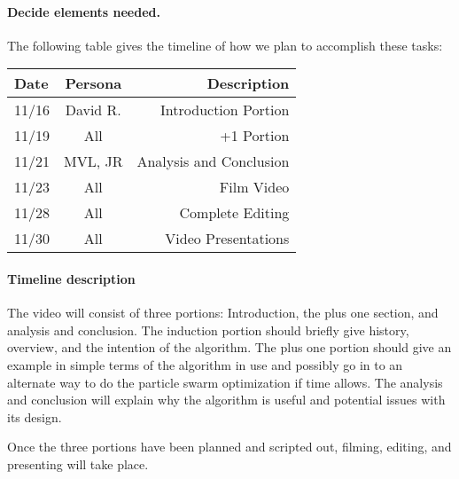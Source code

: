 \documentclass[11pt,twocolumn]{article}
\begin{document}
\paragraph{Decide elements needed.}  

The following table gives the timeline of how we plan to accomplish these tasks:

\begin{table}[h!]
\centering
\begin{tabular}{ |l | c | r|}
  \hline
  Date & Persona & Description \\
  \hline
  \hline
  11/16 & David R. & Introduction Portion \\
  \hline
  11/19 & All & +1 Portion \\
  \hline
  11/21 & MVL, JR & Analysis and Conclusion \\
  \hline
  11/23 & All & Film Video \\
  \hline
  11/28 & All & Complete Editing \\
  \hline
  11/30 & All & Video Presentations \\
  \hline
\end{tabular}
\end{table}

\paragraph{Timeline description}
The video will consist of three portions: Introduction, the plus one section, and analysis and conclusion. The induction portion should briefly give history, overview, and the intention of the algorithm.  The plus one portion should give an example in simple terms of the algorithm in use and possibly go in to an alternate way to do the particle swarm optimization if time allows.  The analysis and conclusion will explain why the algorithm is useful and potential issues with its design.

Once the three portions have been planned and scripted out, filming, editing, and presenting will take place.
\end{document}
